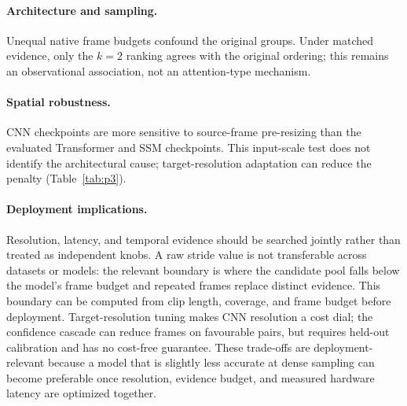 \documentclass[runningheads]{llncs}
\newcommand{\TDS}{\textsc{TDS}}
\newcommand{\rev}[1]{\textcolor{revblue}{#1}}
\newcommand{\revdel}[1]{}
\begin{document}
\paragraph{Architecture and sampling.}
\revdel{Within our evaluated pool, the robust temporal group combines global divided attention or recurrent state integration, while the fragile group includes CNNs and factorized-attention Transformers. This indicates that temporal aggregation design explains the observed robustness groups.} \rev{Unequal native frame budgets confound the original groups. Under matched evidence, only the $k=2$ ranking agrees with the original ordering; this remains an observational association, not an attention-type mechanism.}

\paragraph{Spatial robustness.}
\revdel{The spatial results suggest that temporal and spatial robustness share some architectural ingredients but are not identical. CNNs' strided filters are tied to the spatial scale seen during training, which explains the sharp off-resolution degradation and the large recovery from target-resolution fine-tuning. Transformers remain stable across most resolutions because patch tokenization and global aggregation tolerate scale shifts, yet ViViT shows that this spatial invariance does not guarantee temporal robustness. VideoMamba again sits between these regimes: stable on some datasets, but less reliable on cluttered egocentric or in-vehicle scenes.}\rev{CNN checkpoints are more sensitive to source-frame pre-resizing than the evaluated Transformer and SSM checkpoints. This input-scale test does not identify the architectural cause; target-resolution adaptation can reduce the penalty (Table~\ref{tab:p3}).}

\paragraph{Deployment implications.}
Resolution, latency, and temporal evidence should be searched jointly rather than treated as independent knobs. \revdel{High-\TDS{} domains require stride$\leq$2, moderate-\TDS{} domains tolerate stride$\leq$4, and low-\TDS{} domains tolerate stride up to 16.} \rev{A raw stride value is not transferable across datasets or models: the relevant boundary is where the candidate pool falls below the model's frame budget and repeated frames replace distinct evidence. This boundary can be computed from clip length, coverage, and frame budget before deployment.} Target-resolution tuning makes CNN resolution a cost dial; \revdel{TimeSformer routing at 7.7 frames matches dense R2+1D on SSv2.} \rev{the confidence cascade can reduce frames on favourable pairs, but requires held-out calibration and has no cost-free guarantee.} These trade-offs are deployment-relevant because a model that is slightly less accurate at dense sampling can become preferable once resolution, evidence budget, and measured hardware latency are optimized together.
\end{document}
